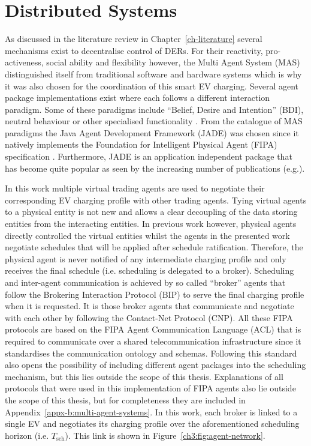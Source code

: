 \section{Distributed Systems}
\label{ch3:sec:distributed-systems}

As discussed in the literature review in Chapter~\ref{ch-literature} several mechanisms exist to decentralise control of DERs.
For their reactivity, pro-activeness, social ability and flexibility however, the Multi Agent System (MAS) distinguished itself from traditional software and hardware systems which is why it was also chosen for the coordination of this smart EV charging.
Several agent package implementations exist where each follows a different interaction paradigm.
Some of these paradigms include ``Belief, Desire and Intention'' (BDI), neutral behaviour or other specialised functionality \cite{Luck2004}.
From the catalogue of MAS paradigms the Java Agent Development Framework (JADE) was chosen since it natively implements the Foundation for Intelligent Physical Agent (FIPA) specification \cite{JADE-website, FIPA-agent-specs}.
Furthermore, JADE is an application independent package that has become quite popular as seen by the increasing number of publications (e.g.\cite{Karfopoulos2013, Eddy2011, Kuo2013, Mocci2014, Li2017}).

In this work multiple virtual trading agents are used to negotiate their corresponding EV charging profile with other trading agents.
Tying virtual agents to a physical entity is not new \cite{Dimeas2005, Nguyen2011, Nagata2011, Nagata2012} and allows a clear decoupling of the data storing entities from the interacting entities.
In previous work however, physical agents directly controlled the virtual entities whilst the agents in the presented work negotiate schedules that will be applied after schedule ratification.
Therefore, the physical agent is never notified of any intermediate charging profile and only receives the final schedule (i.e. scheduling is delegated to a broker).
Scheduling and inter-agent communication is achieved by so called ``broker'' agents that follow the Brokering Interaction Protocol (BIP) to serve the final charging profile when it is requested.
It is those broker agents that communicate and negotiate with each other by following the Contact-Net Protocol (CNP).
All these FIPA protocols are based on the FIPA Agent Communication Language (ACL) that is required to communicate over a shared telecommunication infrastructure since it standardises the communication ontology and schemas.
Following this standard also opens the possibility of including different agent packages into the scheduling mechanism, but this lies outside the scope of this thesis.
Explanations of all protocols that were used in this implementation of FIPA agents also lie outside the scope of this thesis, but for completeness they are included in Appendix~\ref{appx-b:multi-agent-systems}.
In this work, each broker is linked to a single EV and negotiates its charging profile over the aforementioned scheduling horizon (i.e. $T_\text{sch}$).
This link is shown in Figure~\ref{ch3:fig:agent-network}.

